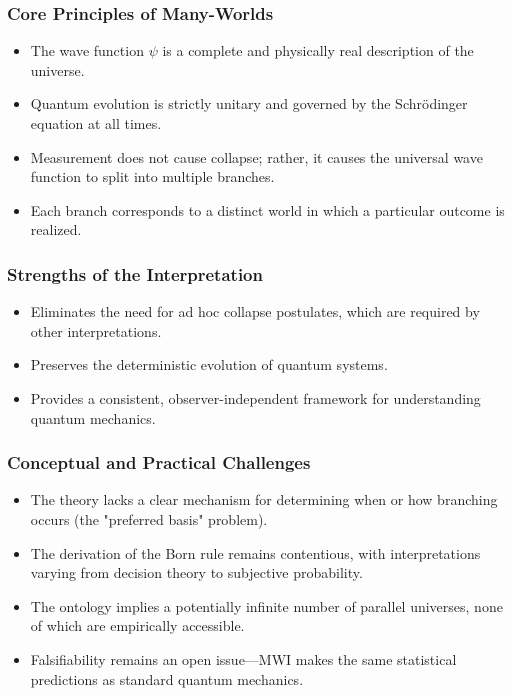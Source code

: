 \documentclass[12pt]{article}
\begin{document}
\subsubsection*{Core Principles of Many-Worlds}

\begin{itemize}
    \item The wave function \( \psi \) is a complete and physically real description of the universe.
    \item Quantum evolution is strictly unitary and governed by the Schrödinger equation at all times.
    \item Measurement does not cause collapse; rather, it causes the universal wave function to split into multiple branches.
    \item Each branch corresponds to a distinct world in which a particular outcome is realized.
\end{itemize}

\subsubsection*{Strengths of the Interpretation}

\begin{itemize}
    \item Eliminates the need for ad hoc collapse postulates, which are required by other interpretations.
    \item Preserves the deterministic evolution of quantum systems.
    \item Provides a consistent, observer-independent framework for understanding quantum mechanics.
\end{itemize}

\subsubsection*{Conceptual and Practical Challenges}

\begin{itemize}
    \item The theory lacks a clear mechanism for determining when or how branching occurs (the "preferred basis" problem).
    \item The derivation of the Born rule remains contentious, with interpretations varying from decision theory to subjective probability.
    \item The ontology implies a potentially infinite number of parallel universes, none of which are empirically accessible.
    \item Falsifiability remains an open issue—MWI makes the same statistical predictions as standard quantum mechanics.
\end{itemize}
\end{document}
